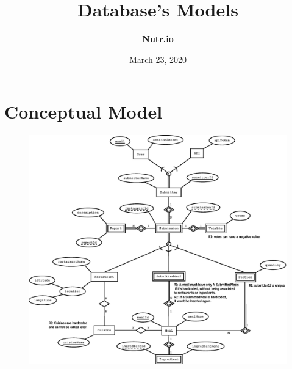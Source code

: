 \documentclass{article}
\title{\textbf{Database's Models}}
\date{March 23, 2020}
\author{\textbf{Nutr.io}}
\begin{document}
\maketitle

\section{Conceptual Model}

\begin{figure}[H]
    \centering
    \includegraphics[scale=0.45]{Nutr.io_Database_Diagram.eps}
\end{figure}
\newpage
\end{document}
